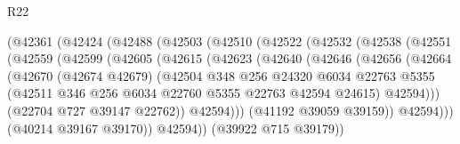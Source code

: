 \begin{lexlean}{R22}
\begin{coremodule}
                      (@42361
                        (@42424
                          (@42488
                            (@42503
                              (@42510
                                (@42522
                                  (@42532
                                    (@42538
                                      (@42551
                                        (@42559
                                          (@42599
                                            (@42605
                                              (@42615
                                                (@42623
                                                  (@42640
                                                    (@42646
                                                      (@42656
                                                        (@42664
                                                          (@42670
                                                            (@42674 @42679)
                                                            (@42504
                                                              @348
                                                              @256
                                                              @24320
                                                              @6034
                                                              @22763
                                                              @5355
                                                              (@42511
                                                                @346
                                                                @256
                                                                @6034
                                                                @22760
                                                                @5355
                                                                @22763
                                                                @42594
                                                                @24615)
                                                              @42594)))
                                                        (@22704 @727 @39147 @22762))
                                                      @42594)))
                                                (@41192 @39059 @39159))
                                              @42594)))
                                        (@40214 @39167 @39170))
                                      @42594))
                                  (@39922 @715 @39179))

\end{coremodule}
\end{lexlean}
